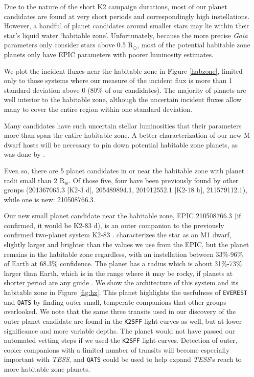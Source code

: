 \documentclass[twocolumn]{aastex62}
\newcommand{\project}[1]{\textsl{#1}}
\newcommand{\pipeline}[1]{\texttt{#1}}
\begin{document}
Due to the nature of the short K2 campaign durations, most of our
planet candidates are found at very short periods and correspondingly
high instellations. However, a handful of planet candidates around
smaller stars may lie within their star's liquid water `habitable
zone'. Unfortunately, because the more precise \project{Gaia}
parameters only consider stars above 0.5 R$_\odot$, most of the
potential habitable zone planets only have EPIC parameters with poorer
luminosity estimates.

We plot the incident fluxes near the habitable zone in Figure
\ref{habzone}, limited only to those systems where our measure of the
incident flux is more than 1 standard deviation above 0 (80\% of our
candidates). The majority of planets are well interior to the
habitable zone, although the uncertain incident fluxes allow many to
cover the entire region within one standard deviation.

Many candidates have such uncertain stellar luminosities that their
parameters more than span the entire habitable zone. A better
characterization of our new M dwarf hosts will be necessary to pin
down potential habitable zone planets, as was done by \cite{dre17b}.

Even so, there are 5 planet candidates in or near the habitable zone
with planet radii small than 2 R$_\oplus$. Of those five, four have
been previously found by other groups (201367065.3 [K2-3 d],
205489894.1, 201912552.1 [K2-18 b], 211579112.1), while one is new:
210508766.3.

Our new small planet candidate near the habitable zone, EPIC
210508766.3 (if confirmed, it would be K2-83 d), is an outer companion
to the previously confirmed two-planet system K2-83 \citep{cro16,
  dre17}. \cite{dre17b} characterizes the star as an M1 dwarf,
slightly larger and brighter than the values we use from the EPIC, but
the planet remains in the habitable zone regardless, with an
instellation between 33\%-96\% of Earth at 68.3\% confidence.  The
planet has a radius which is about 31\%-73\% larger than Earth, which
is in the range where it may be rocky, if planets at shorter period
are any guide \citep{rog15}. We show the architecture of this system
and its habitable zone in Figure \ref{fig:hz}. This planet highlights
the usefulness of \pipeline{EVEREST} and \pipeline{QATS} by finding
outer small, temperate companions that other groups overlooked. We
note that the same three transits used in our discovery of the outer
planet candidate are found in the \pipeline{K2SFF} light curves as
well, but at lower significance and more variable depths. The planet
would not have passed our automated vetting steps if we used the
\pipeline{K2SFF} light curves.  Detection of outer, cooler companions
with a limited number of transits will become especially important
with \project{TESS}, and \pipeline{QATS} could be used to help expand
\project{TESS}'s reach to more habitable zone planets.
\end{document}
